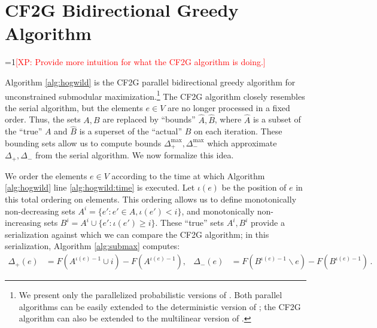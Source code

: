 \documentclass{article} %
\newcommand{\hogwild}{CF2G}
\newcommand{\Comments}{1}
\newcommand{\note}[2]{\ifnum\Comments=1\textcolor{#1}{#2}\fi}
\newcommand{\xinghao}[1]{\note{red}{[XP: #1]}}
\begin{document}
\begin{figure}[h]
\begin{multicols}{2}
\begin{minipage}{0.49\textwidth}
    \end{minipage}



  \end{multicols}
  \label{fig:submax}
\end{figure}








\section{\hogwild{} Bidirectional Greedy Algorithm}
\xinghao{Provide more intuition for what the \hogwild{} algorithm is doing.}

Algorithm \ref{alg:hogwild} is the \hogwild{} parallel bidirectional greedy algorithm for unconstrained submodular maximization.\footnote{We present only the parallelized probabilistic versions of \cite{buchbinder2012}. Both parallel algorithms can be easily extended to the deterministic version of \cite{buchbinder2012}; the \hogwild{} algorithm can also be extended to the multilinear version of \cite{buchbinder2012}.}
The \hogwild{} algorithm closely resembles the serial algorithm, but the elements $e \in V$ are no longer processed in a fixed order.  Thus, the sets $A, B$ are replaced by ``bounds'' $\hat{A}, \hat{B}$, where $\hat{A}$ is a subset of the ``true'' $A$ and $\hat{B}$ is a superset of the ``actual'' $B$ on each iteration.
These bounding sets allow us to compute bounds $\Delta_{+}^{\max}, \Delta_{-}^{\max}$ which approximate $\Delta_{+}, \Delta_{-}$ from the serial algorithm.
We now formalize this idea.

We order the elements $e \in V$ according to the time at which Algorithm \ref{alg:hogwild} line \ref{alg:hogwild:time} is executed.
Let $\iota(e)$ be the position of $e$ in this total ordering on elements.
This ordering allows us to define monotonically non-decreasing sets $A^i = \{e' : e' \in A, \iota(e') < i\}$, and monotonically non-increasing sets $B^i = A^i \cup \{e': \iota(e') \geq i\}$.
These ``true'' sets $A^i, B^i$ provide a serialization against which we can compare the \hogwild{} algorithm; in this serialization, Algorithm \ref{alg:submax} computes:
\begin{align*}
  \Delta_{+}       (e) &= F(A^{\iota(e)-1}\cup i) - F(A^{\iota(e)-1}),
& \Delta_{-}       (e) &= F(B^{\iota(e)-1}\backslash e) - F(B^{\iota(e)-1}) \, .
\end{align*}
\end{document}
